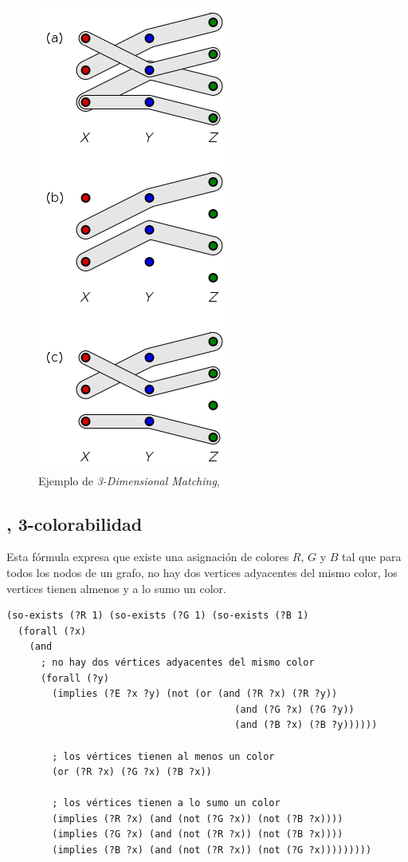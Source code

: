 \begin{figure}[h!]
\centering
\includegraphics[totalheight=0.4\textheight]{figuras/3dimmat.png}
\caption[Ejemplo de \textit{3-Dimensional Matching}, \citep{wiki:3dm}]{Ejemplo de \textit{3-Dimensional Matching}, \citep{wiki:3dm}}
\label{mat3}  
\end{figure}

\subsection{\TCOL, 3-colorabilidad}
Esta fórmula expresa que existe una asignación de colores $R$, $G$ y $B$ tal que para todos los nodos
de un grafo, no hay dos vertices adyacentes del mismo color, los vertices tienen
almenos y a lo sumo un color.
\begin{verbatim}
(so-exists (?R 1) (so-exists (?G 1) (so-exists (?B 1)
  (forall (?x) 
    (and
      ; no hay dos vértices adyacentes del mismo color
      (forall (?y)
        (implies (?E ?x ?y) (not (or (and (?R ?x) (?R ?y))
                                        (and (?G ?x) (?G ?y))
                                        (and (?B ?x) (?B ?y))))))

        ; los vértices tienen al menos un color
        (or (?R ?x) (?G ?x) (?B ?x))

        ; los vértices tienen a lo sumo un color
        (implies (?R ?x) (and (not (?G ?x)) (not (?B ?x))))
        (implies (?G ?x) (and (not (?R ?x)) (not (?B ?x))))
        (implies (?B ?x) (and (not (?R ?x)) (not (?G ?x)))))))))
\end{verbatim}

